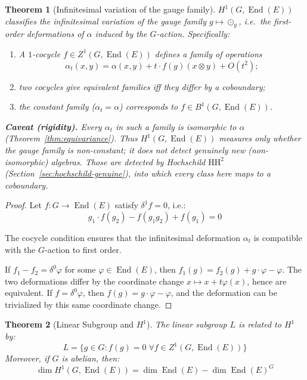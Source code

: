 \documentclass[11pt,a4paper,openany]{book}
\theoremstyle{plain}
\newtheorem{theorem}{Theorem}[chapter]
\theoremstyle{definition}
\newcommand{\twing}[1]{\odot_{#1}}
\newcommand{\lingroup}{L}
\newcommand{\actspace}{E}
\newcommand{\groupG}{G}
\DeclareMathOperator{\End}{End}
\begin{document}
\begin{theorem}[Infinitesimal variation of the gauge family]\label{thm:HH1-deformations}
$H^1(\groupG, \End(\actspace))$ classifies the infinitesimal variation of the gauge family $g\mapsto\twing{g}$, i.e.\ the first-order deformations of $\alpha$ \emph{induced by the $\groupG$-action}. Specifically:
\begin{enumerate}
    \item A $1$-cocycle $f \in Z^1(\groupG, \End(\actspace))$ defines a family of operations
    \[
    \alpha_t(x, y) = \alpha(x, y) + t \cdot f(g)(x \otimes y) + O(t^2);
    \]
    \item two cocycles give equivalent families iff they differ by a coboundary;
    \item the constant family ($\alpha_t = \alpha$) corresponds to $f \in B^1(\groupG, \End(\actspace))$.
\end{enumerate}
\textbf{Caveat (rigidity).} Every $\alpha_t$ in such a family is isomorphic to $\alpha$ (Theorem~\ref{thm:equivariance}). Thus $H^1(\groupG,\End(\actspace))$ measures only whether the gauge family is non-constant; it does \emph{not} detect genuinely new (non-isomorphic) algebras. Those are detected by Hochschild $\mathrm{HH}^2$ (Section~\ref{sec:hochschild-genuine}), into which every class here maps to a \emph{coboundary}.
\end{theorem}

\begin{proof}
Let $f : \groupG \to \End(\actspace)$ satisfy $\delta^1 f = 0$, i.e.:
\[
g_1 \cdot f(g_2) - f(g_1 g_2) + f(g_1) = 0
\]

The cocycle condition ensures that the infinitesimal deformation $\alpha_t$ is compatible with the $\groupG$-action to first order.

If $f_1 - f_2 = \delta^0 \varphi$ for some $\varphi \in \End(\actspace)$, then $f_1(g) = f_2(g) + g \cdot \varphi - \varphi$. The two deformations differ by the coordinate change $x \mapsto x + t\varphi(x)$, hence are equivalent. If $f = \delta^0 \varphi$, then $f(g) = g \cdot \varphi - \varphi$, and the deformation can be trivialized by this same coordinate change.
\end{proof}

\begin{theorem}[Linear Subgroup and $H^1$]\label{thm:L-and-HH1}
The linear subgroup $\lingroup$ is related to $H^1$ by:
\[
\lingroup = \{g \in \groupG : f(g) = 0 \;\forall f \in Z^1(\groupG, \End(\actspace))\}
\]
Moreover, if $\groupG$ is abelian, then:
\[
\dim H^1(\groupG, \End(\actspace)) = \dim \End(\actspace) - \dim \End(\actspace)^\groupG
\]
\end{theorem}
\end{document}
